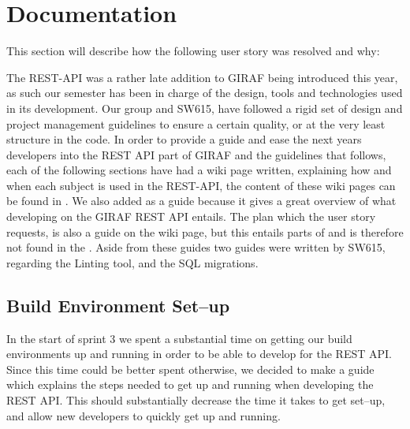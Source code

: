 \section{Documentation}
This section will describe how the following user story was resolved and why:  

The REST-API was a rather late addition to GIRAF being introduced this year, as such our semester has been in charge of the design, tools and technologies used in its development.
Our group and SW615, have followed a rigid set of design and project management guidelines to ensure a certain quality, or at the very least structure in the code.
In order to provide a guide and ease the next years developers into the REST API part of GIRAF and the guidelines that follows, each of the following sections have had a wiki page written, explaining how and when each subject is used in the REST-API, the content of these wiki pages can be found in .
We also added  as a guide because it gives a great overview of what developing on the GIRAF REST API entails.
The plan which the user story requests, is also a guide on the wiki page, but this entails parts of  and is therefore not found in the .
Aside from these guides two guides were written by SW615, regarding the Linting tool, and the SQL migrations.

\subsection{Build Environment Set--up}
In the start of sprint 3 we spent a substantial time on getting our build environments up and running in order to be able to develop for the REST API.
Since this time could be better spent otherwise, we decided to make a guide which explains the steps needed to get up and running when developing the REST API.
This should substantially decrease the time it takes to get set--up, and allow new developers to quickly get up and running.

